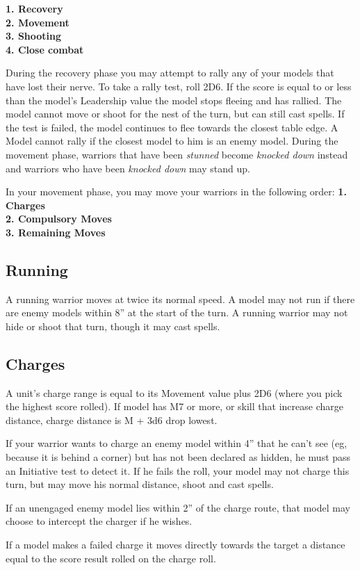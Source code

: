 \begin{multicols}{2}
\begin{nscenter}
\textbf{1. Recovery} \\
\textbf{2. Movement} \\
\textbf{3. Shooting} \\
\textbf{4. Close combat}
\end{nscenter}
\end{multicols}

{\small During the recovery phase you may attempt to rally
any of your models that have lost their nerve. To
take a rally test, roll 2D6. If the score is equal to or
less than the model's Leadership value the model
stops fleeing and has rallied. The model cannot
move or shoot for the nest of the turn, but can still
cast spells. If the test is failed, the model continues
to flee towards the closest table edge. A Model cannot rally if the closest model to him is
an enemy model. During the movement phase, warriors that have been
\textit{stunned} become \textit{knocked down} instead and warriors
who have been \textit{knocked down} may stand up.}

In your movement phase, you may move your
warriors in the following order:
\textbf{1. Charges} \\
\textbf{2. Compulsory Moves} \\
\textbf{3. Remaining Moves}		


\subsection*{Running}

A running warrior moves at twice its normal speed.
A model may not run if there are enemy models
within 8” at the start of the turn.
A running warrior may not hide or shoot that turn,
though it may cast spells.

\subsection*{Charges}
{\small A unit's charge range is equal to its Movement value plus 2D6 (where you pick the highest score rolled). If model has M7 or more, or skill that increase charge distance, charge distance is M + 3d6 drop lowest.

If your warrior wants to charge an enemy model within
4” that he can’t see (eg, because it is behind a corner)
but has not been declared as hidden, he must pass an
Initiative test to detect it. If he fails the roll, your
model may not charge this turn, but may move his
normal distance, shoot and cast spells.

If an unengaged enemy model lies within 2” of the charge route, that
model may choose to intercept the charger if he
wishes. 

If a model makes a failed charge it moves directly towards the target a distance equal to the score result rolled on the charge roll.}

